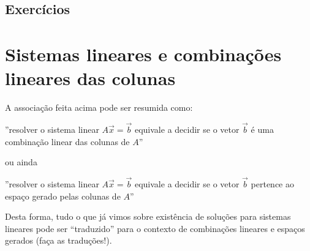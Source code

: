 \subsection*{Exercícios}

\construirExer


\section{Sistemas lineares e combinações lineares das colunas}

A associação feita acima pode ser resumida como:
\begin{center}
  ''resolver o sistema linear $A \vec{x} = \vec{b}$ equivale a decidir
  se o vetor $\vec{b}$ é uma combinação linear das colunas de $A$''
\end{center}
ou ainda
\begin{center}
  ''resolver o sistema linear $A \vec{x} = \vec{b}$ equivale a decidir se o vetor $\vec{b}$ pertence ao espaço gerado pelas colunas de $A$''
\end{center}

Desta forma, tudo o que já vimos sobre existência de soluções para sistemas lineares pode ser ``traduzido'' para o contexto de combinações lineares e espaços gerados (faça as traduções!).


